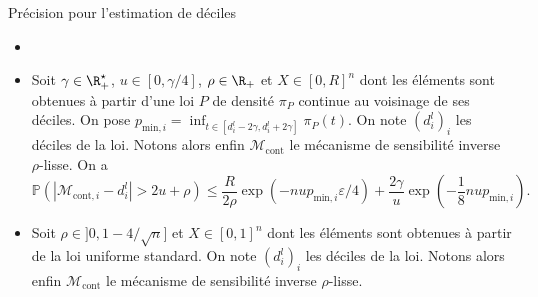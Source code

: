 \documentclass[10pt,serif]{beamer}
\begin{document}
  \begin{frame}{Précision pour l'estimation de déciles}
    \begin{itemize}
      \item {}\vspace{-0.5cm}
      \item<2->{\begin{theorem}
        \label{EDE}
        Soit \(\gamma \in \R_+^\star\), \(u \in [0, \gamma/4]\), \(\rho \in \R_+\) et \(X \in [0,R]^n\) dont les éléments sont obtenues à partir d'une loi \(P\) de densité \(\pi_P\) continue au voisinage de ses déciles. On pose \(p_{\text{min}, i} = \inf_{t \in [d_i^l - 2\gamma, d_i^l + 2\gamma]} \pi_P(t)\). On note \((d_i^l)_i\) les déciles de la loi. Notons alors enfin \(\mathcal M_{\text{cont}}\) le mécanisme de sensibilité inverse \(\rho\)-lisse. On a
        \[
            \mathbb P\left( |\mathcal  M_{\text{cont}, i} - d_i^l| > 2u + \rho \right) \leq  \dfrac{R}{2\rho}\exp\left( -{nup_{\text{min}, i}\varepsilon}/{4} \right) + \dfrac{2\gamma}{u}\exp\left( - \dfrac{1}{8}n u p_{\text{min}, i} \right). 
        \]
      \end{theorem}}
      \vspace{-0.5cm}
      \item<3>{\begin{theorem}
        Soit \(\rho \in ]0, 1 - 4/\sqrt n]\) et \(X \in [0,1]^n\) dont les éléments sont obtenues à partir de la loi uniforme standard. On note \((d_i^l)_i\) les déciles de la loi. Notons alors enfin \(\mathcal M_{\text{cont}}\) le mécanisme de sensibilité inverse \(\rho\)-lisse.
    

\end{theorem}}
\end{itemize}
\end{frame}
\end{document}
